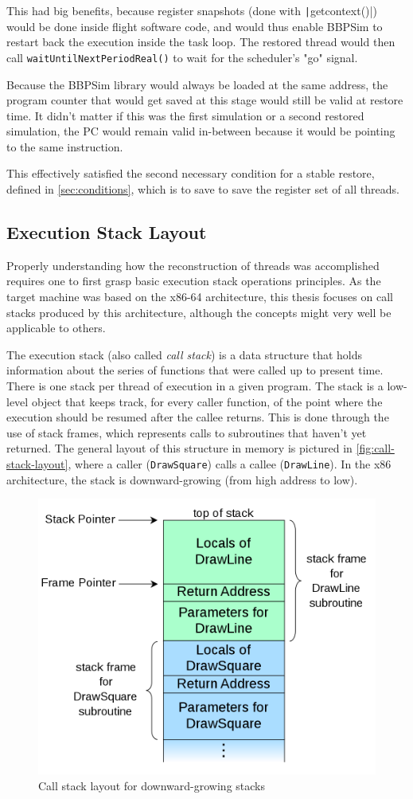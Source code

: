 This had big benefits, because register snapshots (done with \texttt|getcontext()|) would be done inside flight software code, and would thus enable BBPSim to restart back the execution inside the task loop. The restored thread would then call \texttt{waitUntilNextPeriodReal()} to wait for the scheduler's "go" signal.

Because the \gls{BBPSim} library would always be loaded at the same address, the program counter that would get saved at this stage would still be valid at restore time. It didn't matter if this was the first simulation or a second restored simulation, the PC would remain valid in-between because it would be pointing to the same instruction. 

This effectively satisfied the second necessary condition for a stable restore, defined in \autoref{sec:conditions}, which is to save to save the register set of all threads.

\subsection*{Execution Stack Layout}
Properly understanding how the reconstruction of threads was accomplished requires one to first grasp basic execution stack operations principles. As the target machine was based on the x86-64 architecture, this thesis focuses on call stacks produced by this architecture, although the concepts might very well be applicable to others.

The execution stack (also called \textit{call stack}) is a data structure that holds information about the series of functions that were called up to present time. There is one stack per thread of execution in a given program. The stack is a low-level object that keeps track, for every caller function, of the point where the execution should be resumed after the callee returns. This is done through the use of stack frames, which represents calls to subroutines that haven't yet returned. The general layout of this structure in memory is pictured in \autoref{fig:call-stack-layout}, where a caller (\texttt{DrawSquare}) calls a callee (\texttt{DrawLine}). In the x86 architecture, the stack is downward-growing (from high address to low).

\begin{figure}[htbp]
	\centering
	\includegraphics[width=.6\linewidth,keepaspectratio]{art/call-stack-layout.png}
	\caption{Call stack layout for downward-growing stacks\cite{online:stack-img}}
	\label{fig:call-stack-layout}
\end{figure}

